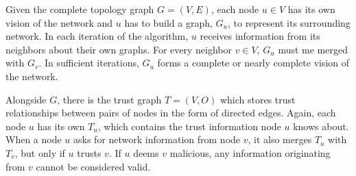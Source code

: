 Given the complete topology graph $G = (V, E)$, each node $u \in V$ has its own vision of the network and $u$ has to build a graph, $G_u$, to represent its surrounding network.
In each iteration of the algorithm, $u$ receives information from its neighbors about their own graphs.
For every neighbor $v \in V$, $G_u$ must me merged with $G_v$.
In sufficient iterations, $G_u$ forms a complete or nearly complete vision of the network.

Alongside $G$, there is the trust graph $T = (V, O)$ which stores trust relationships between pairs of nodes in the form of directed edges.
Again, each node $u$ has its own $T_u$, which contains the trust information node $u$ knows about.
When a node $u$ asks for network information from node $v$, it also merges $T_u$ with $T_v$, but only if $u$ trusts $v$.
If $u$ deems $v$ malicious, any information originating from $v$ cannot be considered valid.



